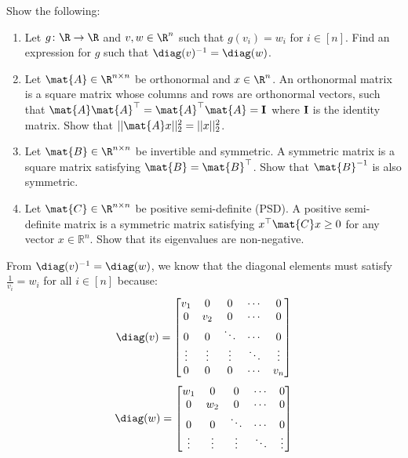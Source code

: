 \documentclass{article}
\begin{document}
\begin{aprob}\label{prob:matrixtype}
    Show the following:
    \begin{enumerate}
        \item {} Let $g\colon \R \rightarrow \R$ and $v, w \in \R^n$ such that $g(v_i) = w_i$ for $i\in[n]$. Find an expression for $g$ such that $\diag(v)^{-1} = \diag(w)$.
        \item {} Let $\mat{A} \in \R^{n \times n}$ be orthonormal and $x \in \R^n$. 
        An orthonormal matrix is a square matrix whose columns and rows are orthonormal vectors, such that $ \mat{A}\mat{A}^\top = \mat{A}^\top \mat{A} = {\bf I}$ where ${\bf I}$ is the identity matrix. 
        Show that $||\mat{A}x||_2^2 = ||x||_2^2$.
        \item {} Let $\mat{B} \in \R^{n \times n}$ be invertible and symmetric. A symmetric matrix is a square matrix satisfying $\mat{B}=\mat{B}^\top$. Show that $\mat{B}^{-1}$ is also symmetric.
        \item {} Let $\mat{C} \in \R^{n \times n}$ be positive semi-definite (PSD). A positive semi-definite matrix is a symmetric matrix satisfying $x^\top \mat{C} x \geq 0$ for any vector $x\in{\mathbb R}^n$. Show that its eigenvalues are non-negative.
    \end{enumerate}
    \begin{tcolorbox}[colback=lightgray!10!white, colframe=black, title=A8.a]
        From $\diag(v)^{-1} = \diag(w)$, we know that the diagonal elements must satisfy $\frac{1}{v_i} = w_i$ for all $i \in [n]$ because:
        \[
            \diag(v) = \begin{bmatrix} 
            v_1 & 0 & 0 & \cdots & 0 \\
            0 & v_2 & 0 & \cdots & 0 \\
            0 & 0 & \ddots & \cdots & 0 \\
            \vdots & \vdots & \vdots & \ddots & \vdots \\
            0 & 0 & 0 & \cdots & v_n
            \end{bmatrix}
        \]
        \[
            \diag(w) = \begin{bmatrix} 
            w_1 & 0 & 0 & \cdots & 0 \\
            0 & w_2 & 0 & \cdots & 0 \\
            0 & 0 & \ddots & \cdots & 0 \\
            \vdots & \vdots & \vdots & \ddots & \vdots \\

\end{bmatrix}\]
\end{tcolorbox}
\end{aprob}
\end{document}
